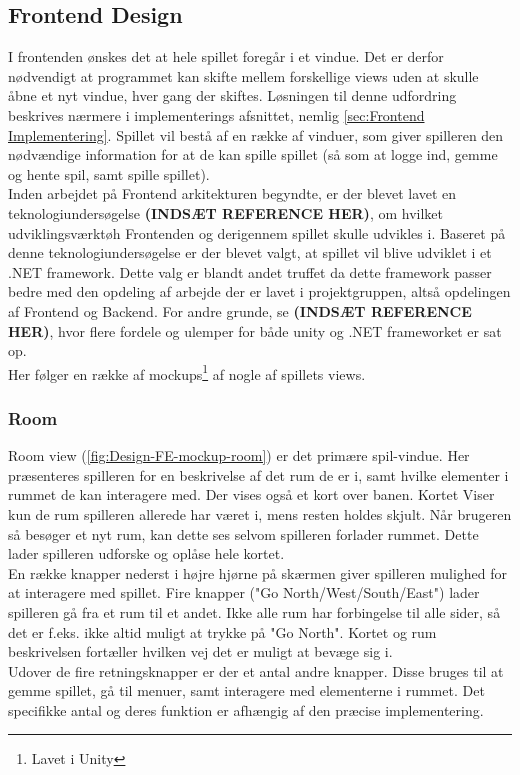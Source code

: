 \subsection{Frontend Design}

I frontenden ønskes det at hele spillet foregår i et vindue. Det er derfor nødvendigt at programmet kan skifte mellem forskellige views uden at skulle åbne et nyt vindue, hver gang der skiftes. Løsningen til denne udfordring beskrives nærmere i implementerings afsnittet, nemlig \autoref{sec:Frontend Implementering}.
Spillet vil bestå af en række af vinduer, som giver spilleren den nødvændige information for at de kan spille spillet (så som at logge ind, gemme og hente spil, samt spille spillet).\\
Inden arbejdet på Frontend arkitekturen begyndte, er der blevet lavet en teknologiundersøgelse \textbf{(INDSÆT REFERENCE HER)}, om hvilket udviklingsværktøh Frontenden og derigennem spillet skulle udvikles i. Baseret på denne teknologiundersøgelse er der blevet valgt, at spillet vil blive udviklet i et .NET framework. Dette valg er blandt andet truffet da dette framework passer bedre med den opdeling af arbejde der er lavet i projektgruppen, altså opdelingen af Frontend og Backend. For andre grunde, se \textbf{(INDSÆT REFERENCE HER)}, hvor flere fordele og ulemper for både unity og .NET frameworket er sat op.\\
Her følger en række af mockups\footnote{Lavet i Unity} af nogle af spillets views.

\subsubsection{Room}

Room view (\autoref{fig:Design-FE-mockup-room}) er det primære spil-vindue. Her præsenteres spilleren for en beskrivelse af det rum de er i, samt hvilke elementer i rummet de kan interagere med. Der vises også et kort over banen. Kortet Viser kun de rum spilleren allerede har været i, mens resten holdes skjult. Når brugeren så besøger et nyt rum, kan dette ses selvom spilleren forlader rummet. Dette lader spilleren udforske og oplåse hele kortet.\\
En række knapper nederst i højre hjørne på skærmen giver spilleren mulighed for at interagere med spillet. Fire knapper ("Go {North/West/South/East}") lader spilleren gå fra et rum til et andet. Ikke alle rum har forbingelse til alle sider, så det er f.eks. ikke altid muligt at trykke på "Go North". Kortet og rum beskrivelsen fortæller hvilken vej det er muligt at bevæge sig i.\\
Udover de fire retningsknapper er der et antal andre knapper. Disse bruges til at gemme spillet, gå til menuer, samt interagere med elementerne i rummet. Det specifikke antal og deres funktion er afhængig af den præcise implementering.

